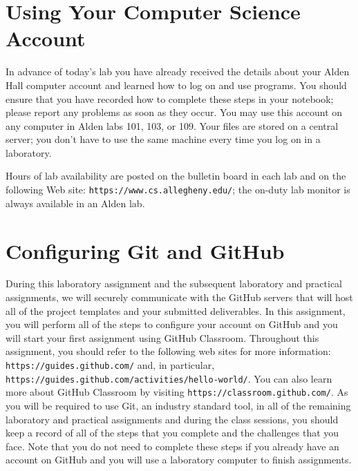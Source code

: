 \documentclass[11pt]{article}
\newcommand{\url}[1]{\lstinline{#1}}
\begin{document}
\section*{Using Your Computer Science Account}

In advance of today's lab you have already received the details about your Alden
Hall computer account and learned how to log on and use programs. You should
ensure that you have recorded how to complete these steps in your notebook;
please report any problems as soon as they occur. You may use this account on
any computer in Alden labs 101, 103, or 109. Your files are stored on a central
server; you don't have to use the same machine every time you log on in a
laboratory.

Hours of lab availability are posted on the bulletin board in each lab and on
the following Web site: \url{https://www.cs.allegheny.edu/}; the on-duty lab
monitor is always available in an Alden lab.

\section*{Configuring Git and GitHub}

During this laboratory assignment and the subsequent laboratory and practical
assignments, we will securely communicate with the GitHub servers that will host
all of the project templates and your submitted deliverables. In this
assignment, you will perform all of the steps to configure your account on
GitHub and you will start your first assignment using GitHub Classroom.
Throughout this assignment, you should refer to the following web sites for more
information: \url{https://guides.github.com/} and, in particular,
\url{https://guides.github.com/activities/hello-world/}. You can also learn more
about GitHub Classroom by visiting \url{https://classroom.github.com/}. As you
will be required to use Git, an industry standard tool, in all of the remaining
laboratory and practical assignments and during the class sessions, you should
keep a record of all of the steps that you complete and the challenges that you
face. Note that you do not need to complete these steps if you already have an
account on GitHub and you will use a laboratory computer to finish assignments.
\end{document}
